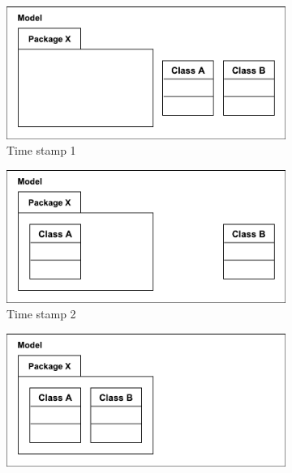 \documentclass[sigplan,review,anonymous]{acmart}\settopmatter{printfolios=true,printccs=false,printacmref=false}
\begin{document}
\begin{figure}[t]
    \begin{subfigure}[t]{0.49\linewidth}
        \centering
        \includegraphics[width=\linewidth]{images/illustration_3}
        \caption{Time stamp 1}
        \label{fig:illustration_3}
    \end{subfigure}
    \begin{subfigure}[t]{0.49\linewidth}
        \centering
        \includegraphics[width=\linewidth]{images/illustration_4}
        \caption{Time stamp 2}
        \label{fig:illustration_4}
    \end{subfigure}
    \hfill
    \begin{subfigure}[t]{0.49\linewidth}
        \centering
        \includegraphics[width=\linewidth]{images/illustration_5}

\end{subfigure}
\end{figure}
\end{document}
